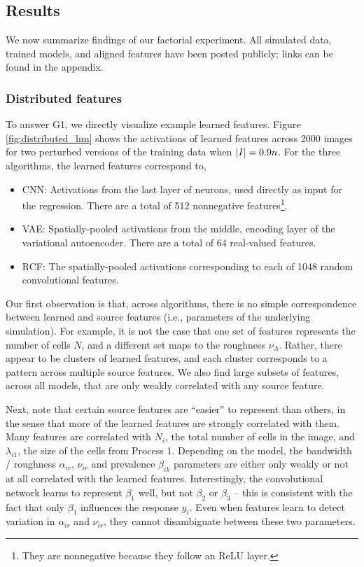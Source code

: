 \subsection{Results}

We now summarize findings of our factorial experiment. All simulated data,
trained models, and aligned features have been posted publicly; links can be
found in the appendix.

\subsubsection{Distributed features}

To answer G1, we directly visualize example learned features. Figure
\ref{fig:distributed_hm} shows the activations of learned features across 2000
images for two perturbed versions of the training data when $\left|I\right| = 0.9n$.
For the three algorithms, the learned features correspond to,

\begin{itemize}
\item CNN: Activations from the last layer of neurons, used directly as input
  for the regression. There are a total of 512 nonnegative
  features\footnote{They are nonnegative because they follow an ReLU layer.}.
\item VAE: Spatially-pooled activations from the middle, encoding layer of the
  variational autoencoder. There are a total of 64 real-valued features.
\item RCF: The spatially-pooled activations corresponding to each of 1048 random
  convolutional features.
\end{itemize}

Our first observation is that, across algorithms, there is no simple
correspondence between learned and source features (i.e., parameters of the
underlying simulation). For example, it is not the case that one set of features
represents the number of cells $N$, and a different set maps to the roughness
$\nu_{\Lambda}$. Rather, there appear to be clusters of learned features, and
each cluster corresponds to a pattern across multiple source features. We also
find large subsets of features, across all models, that are only weakly
correlated with any source feature.

Next, note that certain source features are ``easier'' to represent than others,
in the sense that more of the learned features are strongly correlated with
them. Many features are correlated with $N_{i}$, the total number of cells in
the image, and $\lambda_{i1}$, the size of the cells from Process 1. Depending
on the model, the bandwidth / roughness $\alpha_{ir}$, $\nu_{ir}$ and prevalence
$\beta_{ik}$ parameters are either only weakly or not at all correlated with the
learned features. Interestingly, the convolutional network learns to represent
$\beta_{1}$ well, but not $\beta_{2}$ or $\beta_{3}$ -- this is consistent with
the fact that only $\beta_{1}$ influences the response $y_{i}$. Even when
features learn to detect variation in $\alpha_{ir}$ and $\nu_{ir}$, they cannot
disambiguate between these two parameters.

